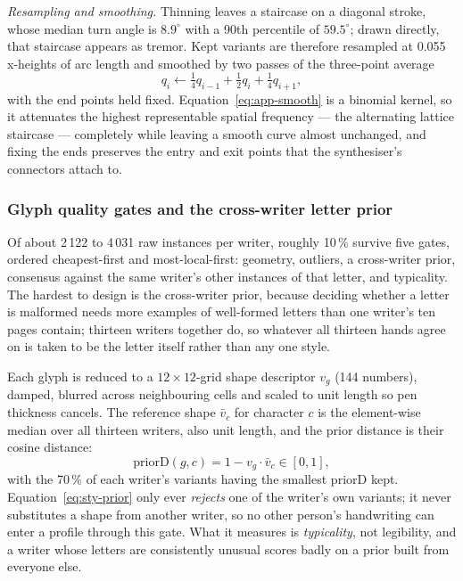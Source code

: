 \emph{Resampling and smoothing.}
Thinning leaves a staircase on a diagonal stroke, whose median turn angle is $8.9^\circ$ with a 90th percentile of $59.5^\circ$; drawn directly, that staircase appears as tremor.
Kept variants are therefore resampled at 0.055 x-heights of arc length and smoothed by two passes of the three-point average
\begin{equation}
q_i\leftarrow\tfrac14q_{i-1}+\tfrac12q_i+\tfrac14q_{i+1},
\label{eq:app-smooth}
\end{equation}
with the end points held fixed.
Equation~\ref{eq:app-smooth} is a binomial kernel, so it attenuates the highest representable spatial frequency --- the alternating lattice staircase --- completely while leaving a smooth curve almost unchanged, and fixing the ends preserves the entry and exit points that the synthesiser's connectors attach to.

\subsubsection{Glyph quality gates and the cross-writer letter prior}
\label{sec:sty-gates}

Of about 2\,122 to 4\,031 raw instances per writer, roughly 10\,\% survive five gates, ordered cheapest-first and most-local-first: geometry, outliers, a cross-writer prior, consensus against the same writer's other instances of that letter, and typicality. The hardest to design is the cross-writer prior, because deciding whether a letter is malformed needs more examples of well-formed letters than one writer's ten pages contain; thirteen writers together do, so whatever all thirteen hands agree on is taken to be the letter itself rather than any one style.

Each glyph is reduced to a $12\times12$-grid shape descriptor $v_g$ (144 numbers), damped, blurred across neighbouring cells and scaled to unit length so pen thickness cancels. The reference shape $\bar v_c$ for character $c$ is the element-wise median over all thirteen writers, also unit length, and the prior distance is their cosine distance:
\begin{equation}
\mathrm{priorD}(g,c)=1-v_g\cdot\bar v_c\in[0,1],
\label{eq:sty-prior}
\end{equation}
with the 70\,\% of each writer's variants having the smallest $\mathrm{priorD}$ kept. Equation~\ref{eq:sty-prior} only ever \emph{rejects} one of the writer's own variants; it never substitutes a shape from another writer, so no other person's handwriting can enter a profile through this gate. What it measures is \emph{typicality}, not legibility, and a writer whose letters are consistently unusual scores badly on a prior built from everyone else.

